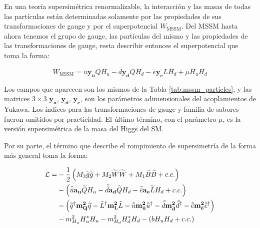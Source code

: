 En una teoría supersimétrica renormalizable, la interacción y las masas de todas las partículas están determinadas solamente por las propiedades de sus transformaciones de gauge y por el superpotencial $W_{\text{MSSM}}$. 
Del MSSM hasta ahora tenemos el grupo de gauge, las partículas del mismo y las propiedades de las transformaciones de gauge, resta describir entonces el superpotencial que toma la forma:

\begin{equation}
	W_{\text{MSSM}} = \bar{u}\textbf{y}_\textbf{u}QH_u - \bar{d}\textbf{y}_\textbf{d}QH_d - \bar{e}\textbf{y}_\textbf{e}LH_d + \mu H_u H_d
	\label{eq:susy_potential}
\end{equation}

Los campos que aparecen son los mismos de la Tabla \ref{tab:mssm_particles}, y las matrices $3\times3$ $\textbf{y}_\textbf{u}$, $\textbf{y}_\textbf{d}$, $\textbf{y}_\textbf{e}$, son los parámetros adimensionales del acoplamientos de Yukawa. Los índices para las transformaciones de gauge y familia de sabores fueron omitidos por practicidad. El último término, con el parámetro $\mu$, es la versión supersimétrica de la masa del Higgs del SM.

Por su parte, el término que describe el rompimiento de supersimetría de la forma más general toma la forma:

\begin{equation}
	\begin{split}
		\mathcal{L} = & -\frac{1}{2}\left( M_3 \widetilde{g}\widetilde{g} + M_2 \widetilde{W}\widetilde{W} + M_1 \widetilde{B}\widetilde{B} + c.c. \right) \\
			& - \left( \tilde{\bar{u}}\textbf{a}_\textbf{u}\widetilde{Q}H_u -  \tilde{\bar{d}}\textbf{a}_\textbf{d}\widetilde{Q}H_d -  \tilde{\bar{e}}\textbf{a}_\textbf{e}\widetilde{L}H_d + c.c. \right) \\
			& - \left( \widetilde{q}^{\dagger} \textbf{m}_{\textbf{Q}}^{\textbf{2}}\widetilde{q} - \tilde{L}^{\dagger}\textbf{m}_{\textbf{L}}^{\textbf{2}}\tilde{L} - \tilde{\bar{u}}\textbf{m}_{\bar{\textbf{u}}}^{\textbf{2}}\tilde{\bar{u}}^{\dagger} - \tilde{\bar{d}}\textbf{m}_{\bar{\textbf{d}}}^{\textbf{2}}\tilde{\bar{d}}^{\dagger} - \tilde{\bar{e}}\textbf{m}_{\bar{\textbf{e}}}^{\textbf{2}}\tilde{\bar{e}}^{\dagger} \right) \\
			& - m_{H_u}^2 H_u^* H_u - m_{H_d}^2 H_d^* H_d - (b H_u H_d + c.c.) \\
	\end{split}
\end{equation}

